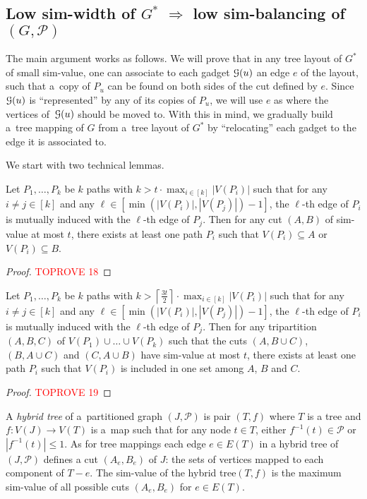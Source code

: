 \documentclass[a4paper,UKenglish,cleveref,hyperref,autoref]{lipics-v2021}
\renewcommand{\leq}{\leqslant}
\renewcommand{\le}{\leq}
\newcommand{\tmap}{tree mapping\xspace}
\newcommand{\tmaps}{tree mappings\xspace}
\newcommand{\htree}{hybrid tree\xspace}
\begin{document}
\subsection{Low sim-width of $G^*$ $\Rightarrow$ low sim-balancing of~$(G,\mathcal P)$}\label{sec:sim-width-to-sim-balancing}




The main argument works as follows.
We will prove that in any tree layout of $G^*$ of small sim-value, one can associate to each gadget $\mathcal G(u)$ an edge $e$ of the layout, such that a~copy of $P_u$ can be found on both sides of the cut defined by $e$.
Since $\mathcal G(u)$ is ``represented'' by any of its copies of $P_u$, we will use $e$ as where the vertices of~$\mathcal G(u)$ should be moved to.
With this in mind, we gradually build a~\tmap of $G$ from a~tree layout of $G^*$ by ``relocating'' each gadget to the edge it is associated to.

We start with two technical lemmas.

\begin{lemma}\label{lem:cut-doesnt-cut}
Let $P_1, \dots, P_k$ be $k$ paths with $k > t \cdot \max_{i \in [k]} |V(P_i)|$ such that for any $i \neq j \in [k]$ and any $\ell \in [\min(|V(P_i)|,|V(P_j)|)-1]$, the $\ell$-th edge of $P_i$ is mutually induced with the $\ell$-th edge of $P_j$.
Then for any cut $(A, B)$ of sim-value at most $t$, there exists at least one path $P_i$ such that $V(P_i)\subseteq A$ or $V(P_i)\subseteq B$.
\end{lemma}
\begin{proof}\textcolor{red}{TOPROVE 18}\end{proof}

\begin{lemma}\label{lem:tricut-doesnt-cut}
Let $P_1, \dots, P_k$ be $k$ paths with $k > \left \lceil \frac{3t}{2} \right \rceil \cdot \max_{i \in [k]} |V(P_i)|$ such that for any $i \neq j \in [k]$ and any $\ell \in [\min(|V(P_i)|,|V(P_j)|)-1]$, the $\ell$-th edge of $P_i$ is mutually induced with the $\ell$-th edge of $P_j$.
Then for any tripartition $(A, B, C)$ of $V(P_1) \cup \ldots \cup V(P_k)$ such that the cuts $(A,B \cup C)$, $(B,A \cup C)$ and $(C, A \cup B)$ have sim-value at most $t$, there exists at least one path $P_i$ such that $V(P_i)$ is included in one set among $A$, $B$ and $C$.
\end{lemma}
\begin{proof}\textcolor{red}{TOPROVE 19}\end{proof}

A \emph{\htree} of a~partitioned graph $(J, \mathcal P)$ is pair $(T, f)$ where $T$ is a tree and $f \colon V(J) \rightarrow V(T)$ is a~map such that for any node $t \in T$, either $f^{-1}(t) \in \mathcal P$ or $|f^{-1}(t)| \le 1$.
As for \tmaps each edge $e \in E(T)$ in a \htree of $(J, \mathcal P)$ defines a cut $(A_e, B_e)$ of $J$: the sets of vertices mapped to each component of $T-e$.
The sim-value of the \htree $(T, f)$ is the maximum sim-value of all possible cuts $(A_e, B_e)$ for $e \in E(T)$.
\end{document}
